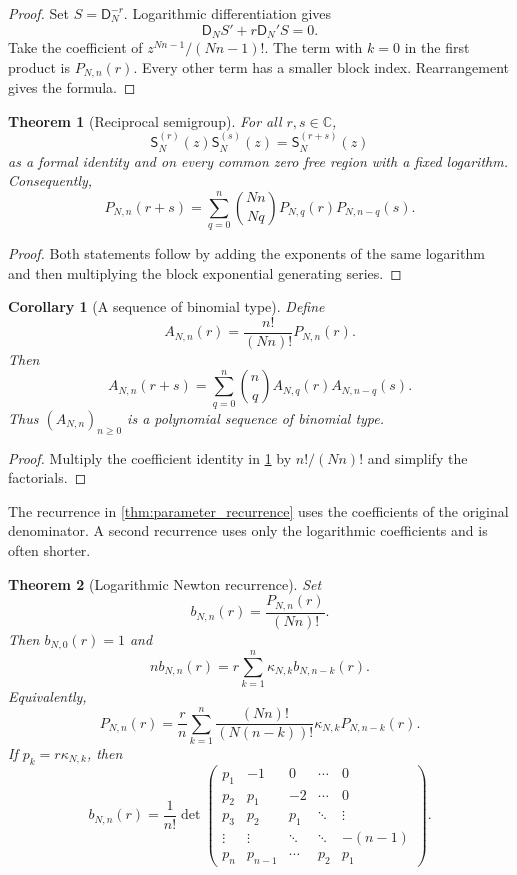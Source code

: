 \documentclass{aomart}
\newtheorem{theorem}{Theorem}[section]
\newtheorem{corollary}[corollary]{Corollary}
\theoremstyle{definition}
\theoremstyle{remark}
\newcommand{\CC}{\mathbb C}
\newcommand{\Dfun}{\mathsf D}
\newcommand{\Sfun}{\mathsf S}
\begin{document}
\begin{proof}
Set $S=\Dfun_N^{-r}$.  Logarithmic differentiation gives
\[
\Dfun_NS'+r\Dfun_N'S=0.
\]
Take the coefficient of $z^{Nn-1}/(Nn-1)!$.  The term with $k=0$ in the first product is $P_{N,n}(r)$.  Every other term has a smaller block index.  Rearrangement gives the formula.
\end{proof}

\begin{theorem}[Reciprocal semigroup]\label{thm:reciprocal_semigroup}
For all $r,s\in\CC$,
\[
\Sfun_N^{(r)}(z)\Sfun_N^{(s)}(z)
=
\Sfun_N^{(r+s)}(z)
\]
as a formal identity and on every common zero free region with a fixed logarithm.  Consequently,
\[
P_{N,n}(r+s)
=
\sum_{q=0}^{n}
\binom{Nn}{Nq}
P_{N,q}(r)P_{N,n-q}(s).
\]
\end{theorem}

\begin{proof}
Both statements follow by adding the exponents of the same logarithm and then multiplying the block exponential generating series.
\end{proof}

\begin{corollary}[A sequence of binomial type]\label{cor:binomial_type}
Define
\[
A_{N,n}(r)
=
\frac{n!}{(Nn)!}P_{N,n}(r).
\]
Then
\[
A_{N,n}(r+s)
=
\sum_{q=0}^{n}
\binom nq
A_{N,q}(r)A_{N,n-q}(s).
\]
Thus $(A_{N,n})_{n\geq0}$ is a polynomial sequence of binomial type.
\end{corollary}

\begin{proof}
Multiply the coefficient identity in \cref{thm:reciprocal_semigroup} by $n!/(Nn)!$ and simplify the factorials.
\end{proof}


The recurrence in \cref{thm:parameter_recurrence} uses the coefficients of the original denominator.  A second recurrence uses only the logarithmic coefficients and is often shorter.

\begin{theorem}[Logarithmic Newton recurrence]\label{thm:logarithmic_newton_recurrence}
Set
\[
b_{N,n}(r)=\frac{P_{N,n}(r)}{(Nn)!}.
\]
Then $b_{N,0}(r)=1$ and
\[
nb_{N,n}(r)
=
r\sum_{k=1}^{n}\kappa_{N,k}b_{N,n-k}(r).
\]
Equivalently,
\[
P_{N,n}(r)
=
\frac r n
\sum_{k=1}^{n}
\frac{(Nn)!}{(N(n-k))!}
\kappa_{N,k}P_{N,n-k}(r).
\]
If $p_k=r\kappa_{N,k}$, then
\[
b_{N,n}(r)
=
\frac1{n!}
\det
\begin{pmatrix}
p_1&-1&0&\cdots&0\\
p_2&p_1&-2&\cdots&0\\
p_3&p_2&p_1&\ddots&\vdots\\
\vdots&\vdots&\ddots&\ddots&-(n-1)\\
p_n&p_{n-1}&\cdots&p_2&p_1
\end{pmatrix}.
\]
\end{theorem}
\end{document}
